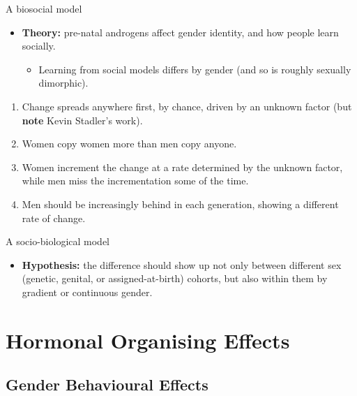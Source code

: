 \documentclass[hyperref={pdfpagelabels=false}]{beamer}
\begin{document}
\begin{frame}{A biosocial model}
	\begin{itemize}
	\item[ ] \textbf{Theory:} pre-natal androgens affect gender identity, and how people learn socially.
	\begin{itemize} \item Learning from social models differs by gender (and so is roughly sexually dimorphic). \end{itemize}
	\end{itemize}
	\begin{enumerate}
	\item Change spreads anywhere first, by chance, driven by an unknown factor (but \textbf{note} Kevin Stadler's work).
	\item Women copy women more than men copy anyone.
	\item Women increment the change at a rate determined by the unknown factor, while men miss the incrementation some of the time.
	\item Men should be increasingly behind in each generation, showing a different rate of change.
	\end{enumerate}

\end{frame}

\begin{frame}{A socio-biological model}
	\begin{itemize}
	\item \textbf{Hypothesis:} the difference should show up not only between different sex (genetic, genital, or assigned-at-birth) cohorts, but also within them by gradient or continuous gender.
	\end{itemize}
\end{frame}







\section{Hormonal Organising Effects}

\subsection{Gender Behavioural Effects}
\end{document}
